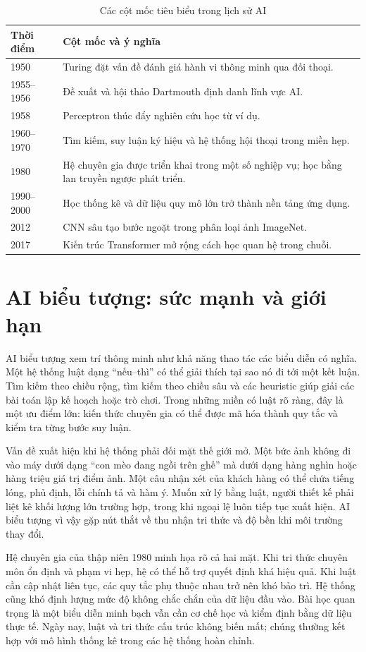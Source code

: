 \documentclass[12pt,a4paper]{report}
\begin{document}
\begin{table}[htbp]\centering\caption{Các cột mốc tiêu biểu trong lịch sử AI}\label{tab:history-timeline}
\begin{tabularx}{\textwidth}{p{1.7cm}X}
\toprule\textbf{Thời điểm} & \textbf{Cột mốc và ý nghĩa}\\\midrule
1950 & Turing đặt vấn đề đánh giá hành vi thông minh qua đối thoại.\\
1955--1956 & Đề xuất và hội thảo Dartmouth định danh lĩnh vực AI.\\
1958 & Perceptron thúc đẩy nghiên cứu học từ ví dụ.\\
1960--1970 & Tìm kiếm, suy luận ký hiệu và hệ thống hội thoại trong miền hẹp.\\
1980 & Hệ chuyên gia được triển khai trong một số nghiệp vụ; học bằng lan truyền ngược phát triển.\\
1990--2000 & Học thống kê và dữ liệu quy mô lớn trở thành nền tảng ứng dụng.\\
2012 & CNN sâu tạo bước ngoặt trong phân loại ảnh ImageNet.\\
2017 & Kiến trúc Transformer mở rộng cách học quan hệ trong chuỗi.\\
\bottomrule\end{tabularx}\end{table}

\section{AI biểu tượng: sức mạnh và giới hạn}
AI biểu tượng xem trí thông minh như khả năng thao tác các biểu diễn có nghĩa. Một hệ thống luật dạng ``nếu--thì'' có thể giải thích tại sao nó đi tới một kết luận. Tìm kiếm theo chiều rộng, tìm kiếm theo chiều sâu và các heuristic giúp giải các bài toán lập kế hoạch hoặc trò chơi. Trong những miền có luật rõ ràng, đây là một ưu điểm lớn: kiến thức chuyên gia có thể được mã hóa thành quy tắc và kiểm tra từng bước suy luận.

Vấn đề xuất hiện khi hệ thống phải đối mặt thế giới mở. Một bức ảnh không đi vào máy dưới dạng ``con mèo đang ngồi trên ghế'' mà dưới dạng hàng nghìn hoặc hàng triệu giá trị điểm ảnh. Một câu nhận xét của khách hàng có thể chứa tiếng lóng, phủ định, lỗi chính tả và hàm ý. Muốn xử lý bằng luật, người thiết kế phải liệt kê khối lượng lớn trường hợp, trong khi ngoại lệ luôn tiếp tục xuất hiện. AI biểu tượng vì vậy gặp nút thắt về thu nhận tri thức và độ bền khi môi trường thay đổi.

Hệ chuyên gia của thập niên 1980 minh họa rõ cả hai mặt. Khi tri thức chuyên môn ổn định và phạm vi hẹp, hệ có thể hỗ trợ quyết định khá hiệu quả. Khi luật cần cập nhật liên tục, các quy tắc phụ thuộc nhau trở nên khó bảo trì. Hệ thống cũng khó định lượng mức độ không chắc chắn của dữ liệu đầu vào. Bài học quan trọng là một biểu diễn minh bạch vẫn cần cơ chế học và kiểm định bằng dữ liệu thực tế. Ngày nay, luật và tri thức cấu trúc không biến mất; chúng thường kết hợp với mô hình thống kê trong các hệ thống hoàn chỉnh.
\end{document}
